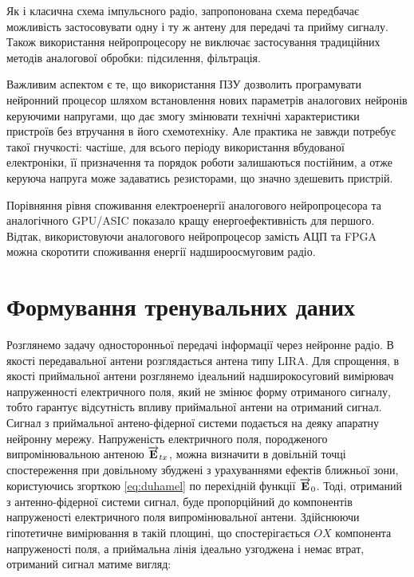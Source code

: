Як і класична схема імпульсного радіо, запропонована схема передбачає 
можливість застосовувати одну і ту ж антену для передачі та прийму сигналу. 
Також використання нейропроцесору не виключає застосування традиційних 
методів аналогової обробки: підсилення, фільтрація.

Важливим аспектом є те, що використання ПЗУ дозволить програмувати нейронний 
процесор шляхом встановлення нових параметрів аналогових нейронів керуючими 
напругами, що дає змогу змінювати технічні характеристики пристроїв без 
втручання в його схемотехніку. Але практика не завжди потребує такої 
гнучкості: частіше, для всього періоду використання вбудованої електроніки, 
її призначення та порядок роботи залишаються постійним, а отже керуюча 
напруга може задаватись резисторами, що значно здешевить пристрій.

Порівняння рівня споживання електроенергії аналогового нейропроцесора та 
аналогічного GPU/ASIC \cite{imp:AnalogLSTM} показало кращу енергоефективність 
для першого. Відтак, використовуючи аналогового нейропроцесор замість АЦП та
FPGA можна скоротити споживання енергії надшироосмуговим радіо.

\section{Формування тренувальних даних}

Розглянемо задачу односторонньої передачі інформації через нейронне радіо. 
В якості передавальної антени розглядається антена типу LIRA. Для спрощення, 
в якості приймальної антени розглянемо ідеальний надширокосуговий вимірювач 
напруженності електричного поля, який не змінює форму отриманого сигналу,
тобто гарантує відсутність впливу приймальної антени на отриманий сигнал. 
Сигнал з приймальної антено-фідерної системи подається на деяку апаратну 
нейронну мережу. Напруженість електричного поля, породженого випромінювальною 
антеною $ \overrightarrow{\mathbf E}_{tx} $, можна визначити в довільній точці спостереження при 
довільному збуджені з урахуваннями ефектів ближньої зони, користуючись 
згорткою \eqref{eq:duhamel} по перехідній функції 
$ \overrightarrow{\mathbf E}_0 $. Тоді, отриманий з антенно-фідерної системи сигнал, буде 
пропорційний до компонентів напруженості електричного поля випромінювальної 
антени. Здійснюючи гіпотетичне вимірювання в такій площині, що спостерігається 
$ OX $ компонента напруженості поля, а приймальна лінія ідеально узгоджена і 
немає втрат, отриманий сигнал матиме вигляд:

